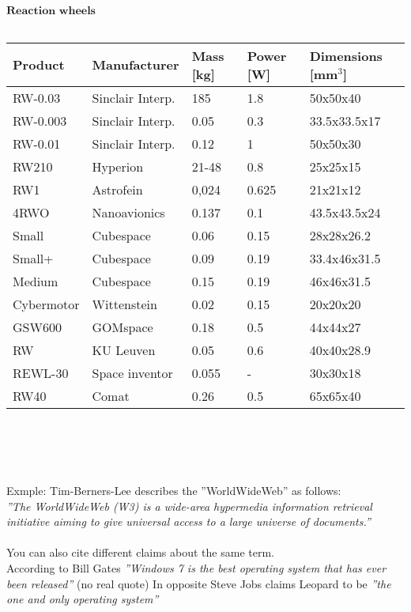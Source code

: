 		      	      $\textbf{Reaction wheels}$\\ \\
		      	      \begin{tabular}{p{3cm}p{3cm}p{2cm}p{2cm}p{2cm}} \toprule
		      	      	Product & Manufacturer & Mass [kg] & Power [W]& Dimensions [mm$^{3}$]\\ \midrule
		      	      	RW-0.03 &	Sinclair Interp.&   185	 &	1.8	 & 50x50x40\\
		      	      	RW-0.003&	Sinclair Interp. &	0.05 &	 0.3 & 33.5x33.5x17\\
		      	      	RW-0.01	&   Sinclair Interp. &	0.12 &	1	 & 	50x50x30\\
		      	      	RW210 &	Hyperion &	21-48 &	0.8 & 25x25x15\\
		      	      	RW1 &	Astrofein &	0,024 &	0.625 &	21x21x12\\
		      	      	4RWO &	Nanoavionics & 0.137 & 0.1 & 43.5x43.5x24\\
		      	      	Small &	Cubespace &	0.06	&	0.15 &	28x28x26.2\\
		      	      	Small+ &	Cubespace &	0.09 &		0.19 &	33.4x46x31.5\\
		      	      	Medium &	Cubespace &	0.15	 &	0.19 &	46x46x31.5\\
		      	      	Cybermotor & Wittenstein & 0.02 &	0.15 & 20x20x20\\
		      	      	GSW600 & GOMspace &	0.18	&	0.5 &	44x44x27\\
		      	      	RW 	 & KU Leuven & 0.05	&	0.6	& 40x40x28.9\\
		      	      	REWL-30	 & Space inventor &	0.055& - & 	30x30x18\\
		      	      	RW40 &	Comat	 & 0.26 &	0.5 &	65x65x40\\ \bottomrule
		      	      	
		      	   
		      	      \end{tabular}\\ \\ \\ \\
		      
		      
		      
		      

Exmple: Tim-Berners-Lee describes the ''WorldWideWeb'' as follows:
\\
\textit{''The WorldWideWeb (W3) is a wide-area hypermedia information retrieval initiative aiming to give universal access to a large universe of documents.''} \cite{timwww}
\\
\\
You can also cite different claims about the same term.
\\
According to Bill Gates \textit{''Windows 7 is the best operating system that has ever been released''} \cite{billgates} (no real quote)
In opposite Steve Jobs claims Leopard to be \textit{''the one and only operating system''} \cite{stevejobs}

